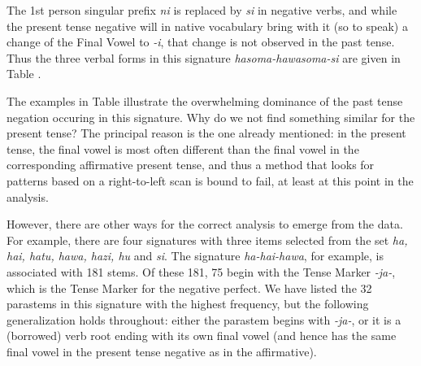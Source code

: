 \documentclass[output=paper,colorlinks,citecolor=brown,
]{langscibook}
\begin{document}
 The 1st person singular prefix \textit{ni} is replaced by \textit{si} in negative verbs, and while the present tense negative will in native vocabulary bring with it (so to speak) a change of the Final Vowel to \textit{-i}, that change is not observed in the past tense. Thus the three verbal forms in this signature \textit{hasoma-hawasoma-si} are given in Table .
 
The examples in Table  illustrate the overwhelming dominance of the past tense negation occuring in this signature. Why do we not find something similar for the present tense? The principal reason is the one already mentioned: in the present tense, the final vowel is most often different than the final vowel in the corresponding affirmative present tense, and thus a method that looks for patterns based on a right-to-left scan is bound to fail, at least at this point in the analysis.

However, there are other ways for the correct analysis to emerge from the data. For example, there are four signatures with three items selected from the set \textit{ha, hai, hatu, hawa, hazi, hu} and \textit{si}. The signature \textit{ha-hai-hawa}, for example, is associated with 181 stems. Of these 181, 75 begin with the Tense Marker \textit{-ja-}, which is the Tense Marker for the negative perfect. We have listed the 32 parastems in this signature with the highest frequency, but the following generalization holds throughout: either the parastem begins with \textit{-ja-}, or it is a (borrowed) verb root ending with its own final vowel (and hence has the same final vowel in the present tense negative as in the affirmative).
\end{document}
